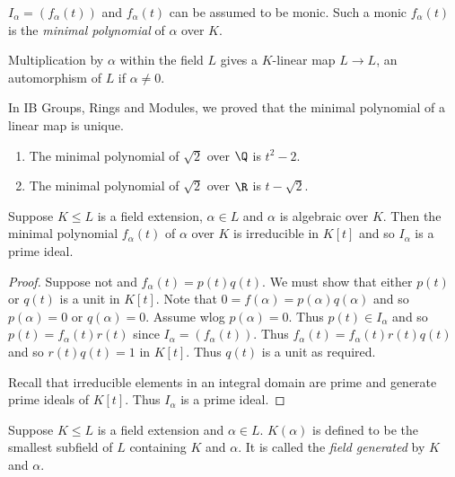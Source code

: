 \documentclass[a4paper]{article}
\begin{document}
\begin{definition}
  \(I_\alpha = (f_\alpha(t))\) and \(f_\alpha(t)\) can be assumed to be monic. Such a monic \(f_\alpha(t)\) is the \emph{minimal polynomial} of \(\alpha\) over \(K\).
\end{definition}

\begin{remark}
  Multiplication by \(\alpha\) within the field \(L\) gives a \(K\)-linear map \(L \to L\), an automorphism of \(L\) if \(\alpha \neq 0\).

  In IB Groups, Rings and Modules, we proved that the minimal polynomial of a linear map is unique.
\end{remark}

\begin{eg}\leavevmode
  \begin{enumerate}
  \item The minimal polynomial of \(\sqrt 2\) over \(\Q\) is \(t^2 - 2\).
  \item The minimal polynomial of \(\sqrt 2\) over \(\R\) is \(t - \sqrt 2\).
  \end{enumerate}
\end{eg}

\begin{lemma}
  Suppose \(K \leq L\) is a field extension, \(\alpha \in L\) and \(\alpha\) is algebraic over \(K\). Then the minimal polynomial \(f_\alpha(t)\) of \(\alpha\) over \(K\) is irreducible in \(K[t]\) and so \(I_\alpha\) is a prime ideal.
\end{lemma}

\begin{proof}
  Suppose not and \(f_\alpha(t) = p(t)q(t)\). We must show that either \(p(t)\) or \(q(t)\) is a unit in \(K[t]\). Note that \(0 = f(\alpha) = p(\alpha)q(\alpha)\) and so \(p(\alpha) = 0\) or \(q(\alpha) = 0\). Assume wlog \(p(\alpha) = 0\). Thus \(p(t) \in I_\alpha\) and so \(p(t) = f_\alpha(t)r(t)\) since \(I_\alpha = (f_\alpha(t))\). Thus \(f_\alpha(t) = f_\alpha(t)r(t)q(t)\) and so \(r(t)q(t) = 1\) in \(K[t]\). Thus \(q(t)\) is a unit as required.

  Recall that irreducible elements in an integral domain are prime and generate prime ideals of \(K[t]\). Thus \(I_\alpha\) is a prime ideal.
\end{proof}

\begin{definition}
  Suppose \(K \leq L\) is a field extension and \(\alpha \in L\). \(K(\alpha)\) is defined to be the smallest subfield of \(L\) containing \(K\) and \(\alpha\). It is called the \emph{field generated} by \(K\) and \(\alpha\).
\end{definition}
\end{document}
